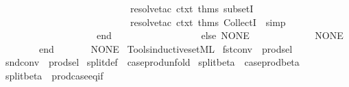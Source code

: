 \begin{isabellebody}
\ \ \ \ \ \ \ \ \ \ \ \ \ \ \ \ \ \ \ \ \ \ \ \ \ \ \ resolve{\isacharunderscore}{\kern0pt}tac\ ctxt\ {\isacharat}{\kern0pt}{\isacharbraceleft}{\kern0pt}thms\ subsetI{\isacharbraceright}{\kern0pt}\ {}{\isacharcomma}{\kern0pt}\isanewline
\ \ \ \ \ \ \ \ \ \ \ \ \ \ \ \ \ \ \ \ \ \ \ \ \ \ \ resolve{\isacharunderscore}{\kern0pt}tac\ ctxt\ {\isacharat}{\kern0pt}{\isacharbraceleft}{\kern0pt}thms\ CollectI{\isacharbraceright}{\kern0pt}\ {}{\isacharcomma}{\kern0pt}\ simp{\isacharbrackright}{\kern0pt}{\isacharparenright}{\kern0pt}{\isacharparenright}{\kern0pt}{\isacharparenright}{\kern0pt}\isanewline
\ \ \ \ \ \ \ \ \ \ \ \ \ \ \ \ \ \ \ \ end\isanewline
\ \ \ \ \ \ \ \ \ \ \ \ \ \ \ \ \ \ else\ NONE{\isacharparenright}{\kern0pt}\isanewline
\ \ \ \ \ \ \ \ \ \ {\isacharbar}{\kern0pt}\ {\isacharunderscore}{\kern0pt}\ {\isacharequal}{\kern0pt}{\isachargreater}{\kern0pt}\ NONE{\isacharparenright}{\kern0pt}\isanewline
\ \ \ \ \ \ \ \ end\isanewline
\ \ \ \ {\isacharbar}{\kern0pt}\ {\isacharunderscore}{\kern0pt}\ {\isacharequal}{\kern0pt}{\isachargreater}{\kern0pt}\ NONE{\isacharparenright}{\kern0pt}\isanewline
{\isacartoucheclose}\isanewline
\isanewline
{}\isamarkupfalse%
\ {\isacartoucheopen}Tools{\isacharslash}{\kern0pt}inductive{\isacharunderscore}{\kern0pt}set{\isachardot}{\kern0pt}ML{\isacartoucheclose}%
\endisatagML
{\isafoldML}%
%
\isadelimML
%
\endisadelimML
%
\isadelimdocument
%
\endisadelimdocument
%
\isatagdocument
%
\isamarkuptrue%
%
\endisatagdocument
{\isafolddocument}%
%
\isadelimdocument
%
\endisadelimdocument
{}\isamarkupfalse%
\ fst{\isacharunderscore}{\kern0pt}conv\ {\isacharequal}{\kern0pt}\ prod{\isachardot}{\kern0pt}sel{\isacharparenleft}{\kern0pt}{}{\isacharparenright}{\kern0pt}\isanewline
{}\isamarkupfalse%
\ snd{\isacharunderscore}{\kern0pt}conv\ {\isacharequal}{\kern0pt}\ prod{\isachardot}{\kern0pt}sel{\isacharparenleft}{\kern0pt}{}{\isacharparenright}{\kern0pt}\isanewline
{}\isamarkupfalse%
\ split{\isacharunderscore}{\kern0pt}def\ {\isacharequal}{\kern0pt}\ case{\isacharunderscore}{\kern0pt}prod{\isacharunderscore}{\kern0pt}unfold\isanewline
{}\isamarkupfalse%
\ split{\isacharunderscore}{\kern0pt}beta{\isacharprime}{\kern0pt}\ {\isacharequal}{\kern0pt}\ case{\isacharunderscore}{\kern0pt}prod{\isacharunderscore}{\kern0pt}beta{\isacharprime}{\kern0pt}\isanewline
{}\isamarkupfalse%
\ split{\isacharunderscore}{\kern0pt}beta\ {\isacharequal}{\kern0pt}\ prod{\isachardot}{\kern0pt}case{\isacharunderscore}{\kern0pt}eq{\isacharunderscore}{\kern0pt}if\isanewline

\end{isabellebody}
